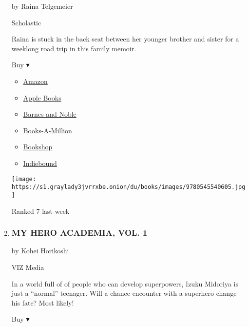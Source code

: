 \begin{enumerate}
  by Raina Telgemeier

  Scholastic

  Raina is stuck in the back seat between her younger brother and sister
  for a weeklong road trip in this family memoir.

  Buy ▾

  \begin{itemize}
  \tightlist
  \item
    \href{http://www.amazon.com/Sisters-Raina-Telgemeier/dp/0545540607?tag=NYTBS-20}{Amazon}
  \item
    \href{https://du-gae-books-dot-nyt-du-prd.appspot.com/buy?title=SISTERS\&author=Raina+Telgemeier}{Apple
    Books}
  \item
    \href{https://www.anrdoezrs.net/click-7990613-11819508?url=https\%3A\%2F\%2Fwww.barnesandnoble.com\%2Fw\%2F\%3Fean\%3D9780545540605}{Barnes
    and Noble}
  \item
    \href{https://www.anrdoezrs.net/click-7990613-35140?url=https\%3A\%2F\%2Fwww.booksamillion.com\%2Fp\%2FSISTERS\%2FRaina\%2BTelgemeier\%2F9780545540605}{Books-A-Million}
  \item
    \href{https://bookshop.org/a/3546/9780545540605}{Bookshop}
  \item
    \href{https://www.indiebound.org/book/9780545540605?aff=NYT}{Indiebound}
  \end{itemize}

  \texttt{[image: https://s1.graylady3jvrrxbe.onion/du/books/images/9780545540605.jpg]}

  Ranked 7 last week
\item
  \hypertarget{my-hero-academia-vol-1}{%
  \subsubsection{MY HERO ACADEMIA, VOL.
  1}\label{my-hero-academia-vol-1}}

  by Kohei Horikoshi

  VIZ Media

  In a world full of of people who can develop superpowers, Izuku
  Midoriya is just a ``normal'' teenager. Will a chance encounter with a
  superhero change his fate? Most likely!

  Buy ▾


\end{enumerate}
